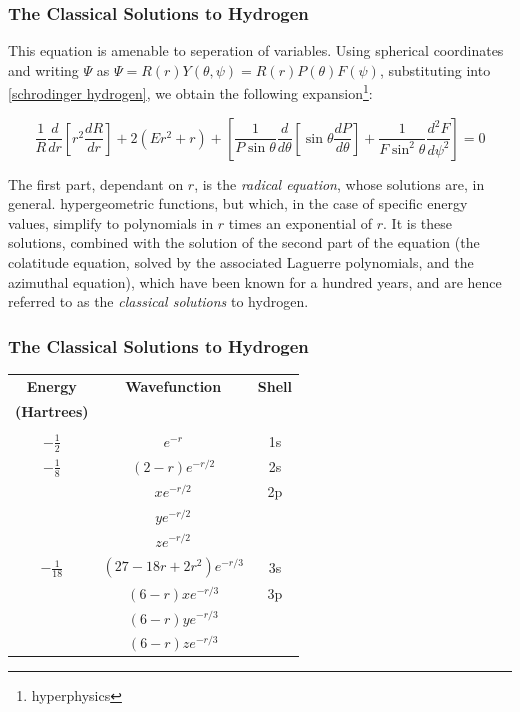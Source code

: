 \documentclass{beamer}
\begin{document}
\begin{frame}
\frametitle{The Classical Solutions to Hydrogen}
This equation is amenable to seperation of variables.
Using spherical coordinates and writing $\Psi$ as $\Psi=R(r)Y(\theta, \psi) = R(r)P(\theta)F(\psi)$,
substituting into \eqref{schrodinger hydrogen}, we obtain the following expansion\footnote{hyperphysics}:

\begin{equation*}
\frac{1}{R} \frac{d}{dr}\left[ r^2 \frac{dR}{dr}\right] + 2(Er^2 + r)
+ \left[\frac{1}{P\sin\theta} \frac{d}{d\theta}\left[\sin\theta\frac{dP}{d\theta}\right]+\frac{1}{F\sin^2\theta}\frac{d^2 F}{d\psi^2}\right] = 0
\end{equation*}

The first part, dependant on $r$, is the {\it radical equation}, whose solutions are, in general.
hypergeometric functions, but which, in the case of specific energy values,
simplify to polynomials in $r$
times an exponential of $r$.  It is these solutions, combined with the solution
of the second part of the equation (the colatitude equation, solved by the associated Laguerre polynomials,
and the azimuthal equation), which have been known for a hundred years, and are
hence referred to as the {\it classical solutions} to hydrogen.
\end{frame}

\begin{frame}
\frametitle{The Classical Solutions to Hydrogen}
\begin{center}
\begin{tabular}{ccc}
{\bf Energy}		& {\bf Wavefunction}		& {\bf Shell} \\
{\bf (Hartrees)}	& & \\
\\
$-\frac{1}{2}$		& $e^{-r}$			& 1s \\
$-\frac{1}{8}$		& $(2-r)e^{-r/2}$		& 2s \\
			& $xe^{-r/2}$			& 2p \\
			& $ye^{-r/2}$			\\
			& $ze^{-r/2}$			\\
$-\frac{1}{18}$		& $(27-18r+2r^2)e^{-r/3}$	& 3s \\
			& $(6-r)xe^{-r/3}$		& 3p \\
			& $(6-r)ye^{-r/3}$		\\
			& $(6-r)ze^{-r/3}$		\\
\end{tabular}
\end{center}
\end{frame}
\end{document}
